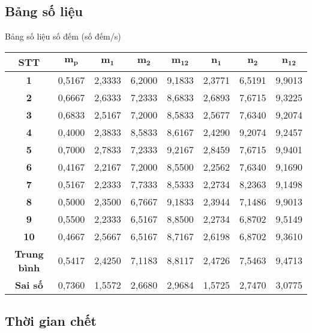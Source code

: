 \documentclass{article}
\begin{document}
\subsection{Bảng số liệu}
Bảng số liệu số đếm (số đếm/s)
\begin{table}[!ht]
	\centering
	\begin{tabular}{cccccccc}
		\hline
		\textbf{STT} & $\mathbf{m_p}$ & $\mathbf{m_1}$ & $\mathbf{m_2}$ & $\mathbf{m_{12}}$ & $\mathbf{n_1}$ & $\mathbf{n_2}$ & $\mathbf{n_{12}}$ \\ \hline
		\textbf{1} & 0,5167 & 2,3333 & 6,2000 & 9,1833 & 2,3771 & 6,5191 & 9,9013 \\
		\textbf{2} & 0,6667 & 2,6333 & 7,2333 & 8,6833 & 2,6893 & 7,6715 & 9,3225 \\
		\textbf{3} & 0,6833 & 2,5167 & 7,2000 & 8,5833 & 2,5677 & 7,6340 & 9,2074 \\
		\textbf{4} & 0,4000 & 2,3833 & 8,5833 & 8,6167 & 2,4290 & 9,2074 & 9,2457 \\
		\textbf{5} & 0,7000 & 2,7833 & 7,2333 & 9,2167 & 2,8459 & 7,6715 & 9,9401 \\
		\textbf{6} & 0,4167 & 2,2167 & 7,2000 & 8,5500 & 2,2562 & 7,6340 & 9,1690 \\
		\textbf{7} & 0,5167 & 2,2333 & 7,7333 & 8,5333 & 2,2734 & 8,2363 & 9,1498 \\
		\textbf{8} & 0,5000 & 2,3500 & 6,7667 & 9,1833 & 2,3944 & 7,1486 & 9,9013 \\
		\textbf{9} & 0,5500 & 2,2333 & 6,5167 & 8,8500 & 2,2734 & 6,8702 & 9,5149 \\
		\textbf{10} & 0,4667 & 2,5667 & 6,5167 & 8,7167 & 2,6198 & 6,8702 & 9,3610 \\ \hline
		\textbf{Trung bình} & 0,5417 & 2,4250 & 7,1183 & 8,8117 & 2,4726 & 7,5463 & 9,4713 \\
		\textbf{Sai số} & 0,7360 & 1,5572 & 2,6680 & 2,9684 & 1,5725 & 2,7470 & 3,0775 \\ \hline
	\end{tabular}
\end{table}

\subsection{Thời gian chết}
\end{document}
